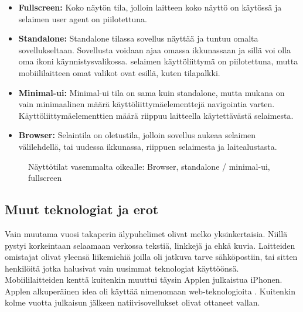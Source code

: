 \documentclass{tktltiki}
\begin{document}
\begin{itemize}
  \item \textbf{Fullscreen:} Koko näytön tila, jolloin laitteen koko näyttö on käytössä ja selaimen user agent on piilotettuna.
  \item \textbf{Standalone:} Standalone tilassa sovellus näyttää ja tuntuu omalta sovellukseltaan. Sovellusta voidaan ajaa omassa ikkunassaan ja sillä voi olla oma ikoni käynnistysvalikossa. selaimen käyttöliittymä on piilotettuna, mutta mobiililaitteen omat valikot ovat esillä, kuten tilapalkki. 
  \item \textbf{Minimal-ui:} Minimal-ui tila on sama kuin standalone, mutta mukana on vain minimaalinen määrä käyttöliittymäelementtejä navigointia varten. Käyttöliittymäelementtien määrä riippuu laitteella käytettävästä selaimesta. 
  \item \textbf{Browser:} Selaintila on oletustila, jolloin sovellus aukeaa selaimen välilehdellä, tai uudessa ikkunassa, riippuen selaimesta ja laitealustasta. 
\end{itemize}

\begin{figure}[h]
\begin{center}
\caption{Näyttötilat vasemmalta oikealle: Browser, standalone / minimal-ui, fullscreen}
\label{Näyttötilat}
\end{center}
\end{figure}
\clearpage

\subsection{Muut teknologiat ja erot}

Vain muutama vuosi takaperin älypuhelimet olivat melko yksinkertaisia. Niillä pystyi korkeintaan selaamaan verkossa tekstiä, linkkejä ja ehkä kuvia. Laitteiden omistajat olivat yleensä liikemiehiä joilla oli jatkuva tarve sähköpostiin, tai sitten henkilöitä jotka halusivat vain uusimmat teknologiat käyttöönsä. Mobiililaitteiden kenttä kuitenkin muuttui täysin Applen julkaistua iPhonen. Applen alkuperäinen idea oli käyttää nimenomaan web-teknologioita \cite{charland2011mobile}. Kuitenkin kolme vuotta julkaisun jälkeen natiivisovellukset olivat ottaneet vallan.
\end{document}
